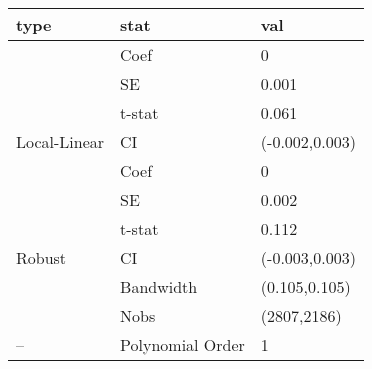 
\begin{tabular}{lll}
\toprule
type & stat & val\\
\midrule
 & Coef & 0\\

 & SE & 0.001\\

 & t-stat & 0.061\\

\multirow{-4}{*}{\raggedright\arraybackslash Local-Linear} & CI & (-0.002,0.003)\\
\cmidrule{1-3}
 & Coef & 0\\

 & SE & 0.002\\

 & t-stat & 0.112\\

\multirow{-4}{*}{\raggedright\arraybackslash Robust} & CI & (-0.003,0.003)\\
\cmidrule{1-3}
 & Bandwidth & (0.105,0.105)\\

 & Nobs & (2807,2186)\\

\multirow{-3}{*}{\raggedright\arraybackslash --} & Polynomial Order & 1\\
\bottomrule
\end{tabular}